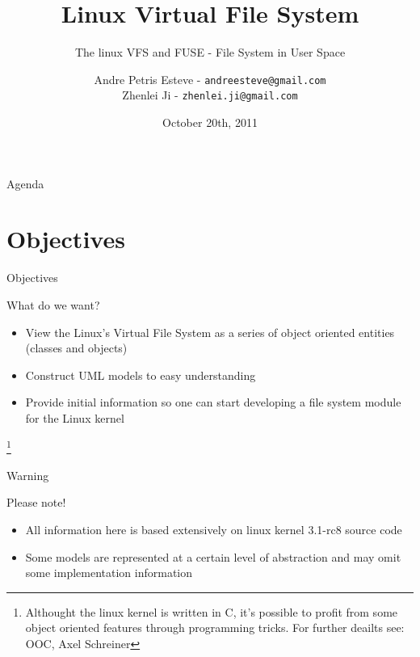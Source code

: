\documentclass{beamer}
\author[Andre Esteve and Zhenlei Ji]{
Andre Petris Esteve - \texttt{andreesteve@gmail.com}\\
Zhenlei Ji - \texttt{zhenlei.ji@gmail.com}}
\institute[IC\textbackslash UNICAMP]{
MC806 - Operational System Topics\\}
\title[Linux VFS]{Linux Virtual File System}
\subtitle[]{The linux VFS and FUSE - File System in User Space}
\date[10/20/2011]{October 20th, 2011}
\begin{document}

\begin{frame}[plain]
  \titlepage
\end{frame}

\begin{frame}{Agenda}
  \tableofcontents[hidesubsections]
\end{frame}

\section{Objectives}

\begin{frame}{Objectives}

  \begin{block}{What do we want?}

	\begin{itemize}[<+->]

		\item{View the Linux's Virtual File System as a series of object oriented entities (classes and objects)}\footnotemark

		\item{Construct UML models to easy understanding}
		
		\item{Provide initial information so one can start developing a file system module for the Linux kernel}
	
	\end{itemize}

  \end{block}

	\footnote[1]{Althought the linux kernel is written in C, it's possible to profit from some object oriented features through programming tricks. For further deailts see: OOC, Axel Schreiner}

\end{frame}

\begin{frame}{Warning}

  \begin{block}{Please note!}

	\begin{itemize}[<+->]

		\item{All information here is based extensively on linux kernel 3.1-rc8 source code}

		\item{Some models are represented at a certain level of abstraction and may omit some implementation information}
	
	\end{itemize}

  \end{block}

\end{frame}
\end{document}
